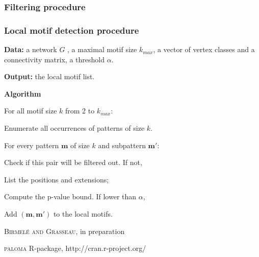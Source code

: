 \documentclass{beamer}
\newcommand{\mot}{\mathbf{m}}
\begin{document}
\begin{frame}
\frametitle{Filtering procedure}




\end{frame}



\begin{frame}
\frametitle{Local motif detection procedure}

{\bf Data:} a network $G$ , a maximal motif size $k_{max}$, a vector of vertex classes and a connectivity matrix, a threshold $\alpha$.

{\bf Output:} the local motif list.
\bigskip


{\bf Algorithm}

For all motif size $k$ from 2 to $k_{max}$: 

\hspace{.5cm} Enumerate all occurrences of patterns of size $k$.

\hspace{.5cm} For every pattern $\mot$ of size $k$ and subpattern $\mot'$:

\hspace{1cm} Check if this pair will be filtered out. If not,

\hspace{1.5cm} List the positions and extensions;

\hspace{1.5cm} Compute the p-value bound. If lower than $\alpha$,

\hspace{2cm} Add $(\mot, \mot')$ to the local motifs. 






{\tiny \textsc{Birmel\'e and Grasseau}, in preparation}

{\tiny \textsc{paloma} R-package, http://cran.r-project.org/ }



\end{frame}
\end{document}
